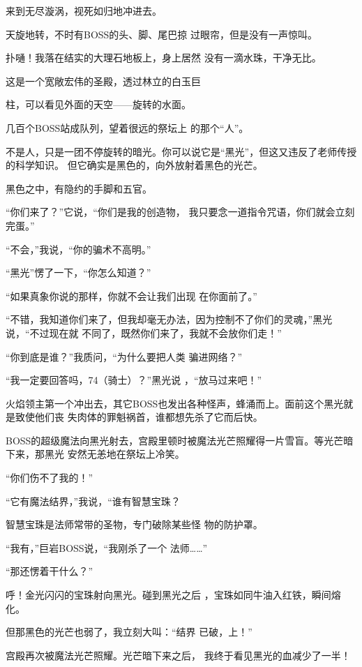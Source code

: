 \documentclass{article}
\begin{document}
来到无尽漩涡，视死如归地冲进去。 

天旋地转，不时有BOSS的头、脚、尾巴掠
过眼帘，但是没有一声惊叫。 

扑嗵！我落在结实的大理石地板上，身上居然
没有一滴水珠，干净无比。 

这是一个宽敞宏伟的圣殿，透过林立的白玉巨
\newpage

柱，可以看见外面的天空——旋转的水面。 

几百个BOSS站成队列，望着很远的祭坛上
的那个“人”。 

不是人，只是一团不停旋转的暗光。你可以说它是“黑光”，但这又违反了老师传授的科学知识。
但它确实是黑色的，向外放射着黑色的光芒。 


黑色之中，有隐约的手脚和五官。 

“你们来了？”它说，“你们是我的创造物，
我只要念一道指令咒语，你们就会立刻完蛋。” 


“不会，”我说，“你的骗术不高明。” 


“黑光”愣了一下，“你怎么知道？” 

“如果真象你说的那样，你就不会让我们出现
在你面前了。” 

\newpage

“不错，我知道你们来了，但我却毫无办法，因为控制不了你们的灵魂，”黑光说，“不过现在就
不同了，既然你们来了，我就不会放你们走！” 

“你到底是谁？”我质问，“为什么要把人类
骗进网络？” 

“我一定要回答吗，74（骑士）？”黑光说
，“放马过来吧！” 

火焰领主第一个冲出去，其它BOSS也发出各种怪声，蜂涌而上。面前这个黑光就是致使他们丧
失肉体的罪魁祸首，谁都想先杀了它而后快。 

BOSS的超级魔法向黑光射去，宫殿里顿时被魔法光芒照耀得一片雪盲。等光芒暗下来，那黑光
安然无恙地在祭坛上冷笑。 


“你们伤不了我的！” 

“它有魔法结界，”我说，“谁有智慧宝珠？
\newpage


智慧宝珠是法师常带的圣物，专门破除某些怪
物的防护罩。 

“我有，”巨岩BOSS说，“我刚杀了一个
法师……” 


“那还愣着干什么？” 

呼！金光闪闪的宝珠射向黑光。碰到黑光之后
，宝珠如同牛油入红铁，瞬间熔化。 

但那黑色的光芒也弱了，我立刻大叫：“结界
已破，上！” 

宫殿再次被魔法光芒照耀。光芒暗下来之后，
我终于看见黑光的血减少了一半！ 
\end{document}
